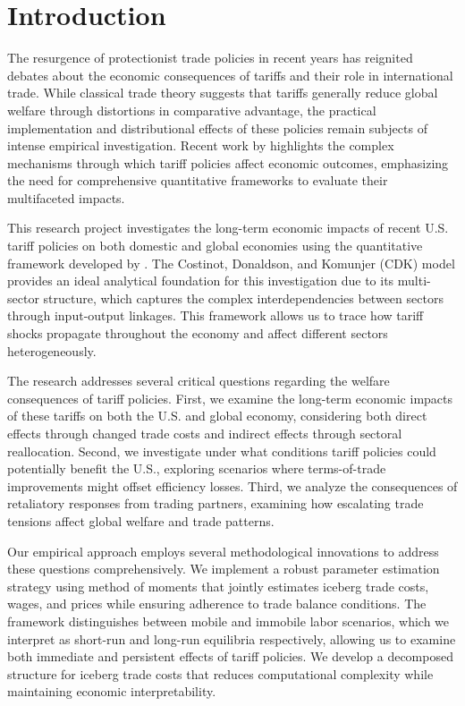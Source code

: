 \section{Introduction}

The resurgence of protectionist trade policies in recent years has reignited debates about the economic consequences of tariffs and their role in international trade. While classical trade theory suggests that tariffs generally reduce global welfare through distortions in comparative advantage, the practical implementation and distributional effects of these policies remain subjects of intense empirical investigation. Recent work by \cite{ignatenko2025making} highlights the complex mechanisms through which tariff policies affect economic outcomes, emphasizing the need for comprehensive quantitative frameworks to evaluate their multifaceted impacts.

This research project investigates the long-term economic impacts of recent U.S. tariff policies on both domestic and global economies using the quantitative framework developed by \cite{costinot2012TheReviewofEconomicStudies}. The Costinot, Donaldson, and Komunjer (CDK) model provides an ideal analytical foundation for this investigation due to its multi-sector structure, which captures the complex interdependencies between sectors through input-output linkages. This framework allows us to trace how tariff shocks propagate throughout the economy and affect different sectors heterogeneously.

The research addresses several critical questions regarding the welfare consequences of tariff policies. First, we examine the long-term economic impacts of these tariffs on both the U.S. and global economy, considering both direct effects through changed trade costs and indirect effects through sectoral reallocation. Second, we investigate under what conditions tariff policies could potentially benefit the U.S., exploring scenarios where terms-of-trade improvements might offset efficiency losses. Third, we analyze the consequences of retaliatory responses from trading partners, examining how escalating trade tensions affect global welfare and trade patterns.

Our empirical approach employs several methodological innovations to address these questions comprehensively. We implement a robust parameter estimation strategy using method of moments that jointly estimates iceberg trade costs, wages, and prices while ensuring adherence to trade balance conditions. The framework distinguishes between mobile and immobile labor scenarios, which we interpret as short-run and long-run equilibria respectively, allowing us to examine both immediate and persistent effects of tariff policies. We develop a decomposed structure for iceberg trade costs that reduces computational complexity while maintaining economic interpretability.

